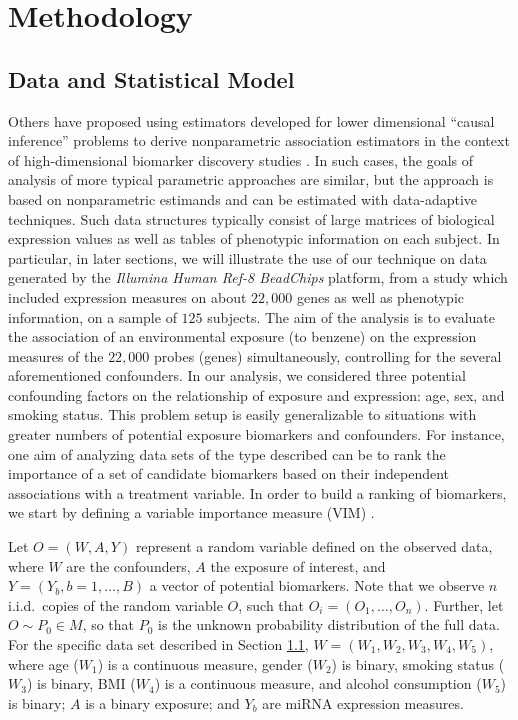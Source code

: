\chapter{Methodology}

\section{Data and Statistical Model}\label{data}

Others have proposed using estimators developed for lower dimensional ``causal
inference'' problems to derive nonparametric association estimators in the
context of high-dimensional biomarker discovery studies
\cite{tuglus2011targeted}. In such cases, the goals of analysis of more typical
parametric approaches are similar, but the approach is based on nonparametric
estimands and can be estimated with data-adaptive techniques. Such data
structures typically consist of large matrices of biological expression values
as well as tables of phenotypic information on each subject. In particular, in
later sections, we will illustrate the use of our technique on data generated by
the \textit{Illumina Human Ref-8 BeadChips} platform, from a study which
included expression measures on about $22,000$ genes as well as phenotypic
information, on a sample of $125$ subjects. The aim of the analysis is to
evaluate the association of an environmental exposure (to benzene) on the
expression measures of the $22,000$ probes (genes) simultaneously, controlling
for the several aforementioned confounders. In our analysis, we considered three
potential confounding factors on the relationship of exposure and expression:
age, sex, and smoking status. This problem setup is easily generalizable to
situations with greater numbers of potential exposure biomarkers and
confounders. For instance, one aim of analyzing data sets of the type described
can be to rank the importance of a set of candidate biomarkers based on their
independent associations with a treatment variable. In order to build a ranking
of biomarkers, we start by defining a variable importance measure (VIM)
\cite{van2011targeted}.

Let $O = (W, A, Y)$ represent a random variable defined on the observed data,
where $W$ are the confounders, $A$ the exposure of interest, and
$Y = (Y_b, b = 1, \dots, B)$ a vector of potential biomarkers. Note that we
observe $n$ i.i.d.~copies of the random variable $O$, such that
$O_i = (O_1, \dots, O_n)$. Further, let $O \sim P_0 \in M$, so that $P_{0}$ is
the unknown probability distribution of the full data. For the specific data
set described in Section \ref{data}, $W = (W_{1}, W_{2}, W_{3}, W_{4}, W_{5})$,
where age ($W_{1}$) is a continuous measure, gender ($W_{2}$) is binary,
smoking status ($W_{3}$) is binary, BMI ($W_{4}$) is a continuous measure, and
alcohol consumption ($W_{5}$) is binary; $A$ is a binary exposure; and $Y_{b}$
are miRNA expression measures.

